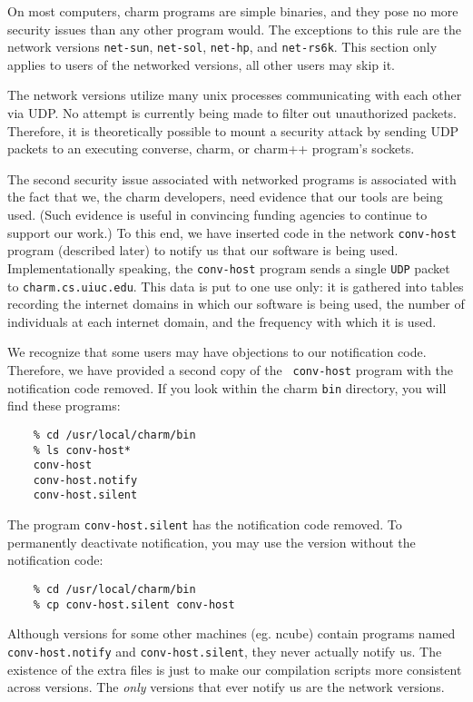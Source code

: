 On most computers, charm programs are simple binaries, and they pose
no more security issues than any other program would.  The exceptions
to this rule are the network versions {\tt net-sun}, {\tt net-sol},
{\tt net-hp}, and {\tt net-rs6k}.  This section only applies to users
of the networked versions, all other users may skip it.

The network versions utilize many unix processes communicating with
each other via UDP.  No attempt is currently being made to filter out
unauthorized packets.  Therefore, it is theoretically possible to
mount a security attack by sending UDP packets to an executing
converse, charm, or charm++ program's sockets.

The second security issue associated with networked programs is
associated with the fact that we, the charm developers, need evidence
that our tools are being used.  (Such evidence is useful in convincing
funding agencies to continue to support our work.)  To this end, we
have inserted code in the network {\tt conv-host} program (described
later) to notify us that our software is being used.
Implementationally speaking, the {\tt conv-host} program sends a
single {\tt UDP} packet to {\tt charm.cs.uiuc.edu}.  This data is put
to one use only: it is gathered into tables recording the internet
domains in which our software is being used, the number of individuals
at each internet domain, and the frequency with which it is used.

We recognize that some users may have objections to our notification
code.  Therefore, we have provided a second copy of the {\tt
conv-host} program with the notification code removed.  If you look
within the charm {\tt bin} directory, you will find these programs:

\begin{verbatim}
    % cd /usr/local/charm/bin
    % ls conv-host*
    conv-host
    conv-host.notify
    conv-host.silent
\end{verbatim}

The program {\tt conv-host.silent} has the notification code removed.  To
permanently deactivate notification, you may use the version without the
notification code:

\begin{verbatim}
    % cd /usr/local/charm/bin
    % cp conv-host.silent conv-host
\end{verbatim}

Although versions for some other machines (eg. ncube) contain
programs named {\tt conv-host.notify} and {\tt conv-host.silent}, they
never actually notify us.  The existence of the extra files is just to
make our compilation scripts more consistent across versions.  The
{\em only} versions that ever notify us are the network versions.


